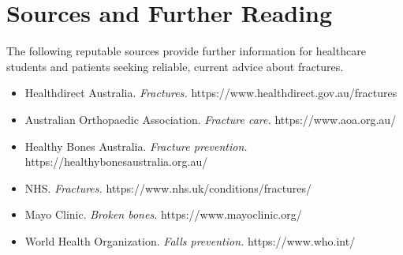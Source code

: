 \section*{Sources and Further Reading}
The following reputable sources provide further information for healthcare students and patients seeking reliable, current advice about fractures.
\begin{itemize}
    \item Healthdirect Australia. \textit{Fractures.} https://www.healthdirect.gov.au/fractures
    \item Australian Orthopaedic Association. \textit{Fracture care.} https://www.aoa.org.au/
    \item Healthy Bones Australia. \textit{Fracture prevention.} https://healthybonesaustralia.org.au/
    \item NHS. \textit{Fractures.} https://www.nhs.uk/conditions/fractures/
    \item Mayo Clinic. \textit{Broken bones.} https://www.mayoclinic.org/
    \item World Health Organization. \textit{Falls prevention.} https://www.who.int/
\end{itemize}
